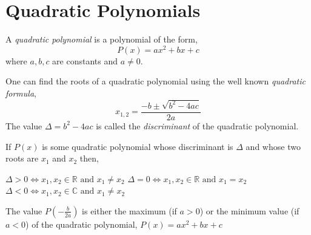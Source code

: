 \documentclass[11pt,numbers=noenddot,svgnames,dvipsnames]{scrartcl}
\begin{document}
\section{Quadratic Polynomials}
\begin{definition}
    A \textit{quadratic polynomial} is a polynomial of the form,
    \[
        P(x) = ax^{2} + bx + c
    \]
    where $a,b,c$ are constants and $a\neq 0$.
\end{definition}
One can find the roots of a quadratic polynomial using the well known \textit{quadratic formula},
\[
    x_{1,2} = \frac{-b \pm \sqrt{b^{2} - 4ac}}{2a}
\]
The value $\Delta = b^{2} - 4ac$ is called the \textit{discriminant} of the quadratic polynomial. 
\begin{theorem}
    If $P(x)$ is some quadratic polynomial whose discriminant is $\Delta$ and 
    whose two roots are $x_{1}$ and $x_{2}$ then,
    \begin{itemize}
            \ii $\Delta>0 \iff x_{1}, x_{2} \in \mathbb{R} \text{ and } x_{1}\neq x_{2}$
            \ii $\Delta=0 \iff x_{1}, x_{2} \in \mathbb{R} \text{ and } x_{1}=x_{2}$
            \ii $\Delta<0 \iff x_{1}, x_{2} \in \mathbb{C} \text{ and } x_{1}\neq x_{2}$
    \end{itemize}
\end{theorem}

\begin{theorem}
    The value $P\left(-\frac{b}{2a}\right)$ is either the maximum (if $a>0$) or the minimum value (if $a<0$) of 
    the quadratic polynomial, $P(x)=ax^{2} + bx + c$
\end{theorem}
\end{document}
